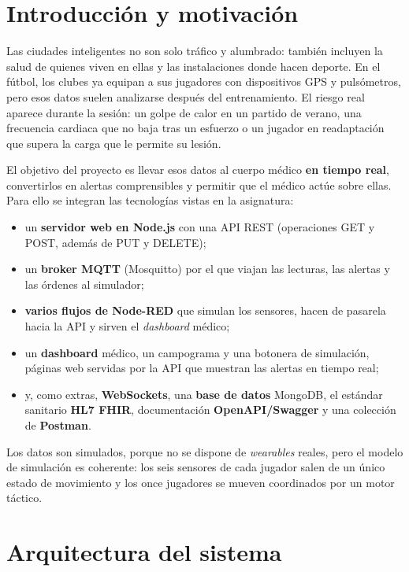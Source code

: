 \documentclass[runningheads]{llncs}
\begin{document}
\section{Introducción y motivación}

Las ciudades inteligentes no son solo tráfico y alumbrado: también incluyen la salud de quienes viven en ellas y las instalaciones donde hacen deporte. En el fútbol, los clubes ya equipan a sus jugadores con dispositivos GPS y pulsómetros, pero esos datos suelen analizarse después del entrenamiento. El riesgo real aparece durante la sesión: un golpe de calor en un partido de verano, una frecuencia cardiaca que no baja tras un esfuerzo o un jugador en readaptación que supera la carga que le permite su lesión.

El objetivo del proyecto es llevar esos datos al cuerpo médico \textbf{en tiempo real}, convertirlos en alertas comprensibles y permitir que el médico actúe sobre ellas. Para ello se integran las tecnologías vistas en la asignatura:

\begin{itemize}
  \item un \textbf{servidor web en Node.js} con una API REST (operaciones GET y POST, además de PUT y DELETE);
  \item un \textbf{broker MQTT} (Mosquitto) por el que viajan las lecturas, las alertas y las órdenes al simulador;
  \item \textbf{varios flujos de Node-RED} que simulan los sensores, hacen de pasarela hacia la API y sirven el \emph{dashboard} médico;
  \item un \textbf{dashboard} médico, un campograma y una botonera de simulación, páginas web servidas por la API que muestran las alertas en tiempo real;
  \item y, como extras, \textbf{WebSockets}, una \textbf{base de datos} MongoDB, el estándar sanitario \textbf{HL7 FHIR}, documentación \textbf{OpenAPI/Swagger} y una colección de \textbf{Postman}.
\end{itemize}

Los datos son simulados, porque no se dispone de \emph{wearables} reales, pero el modelo de simulación es coherente: los seis sensores de cada jugador salen de un único estado de movimiento y los once jugadores se mueven coordinados por un motor táctico.

\section{Arquitectura del sistema}
\end{document}
